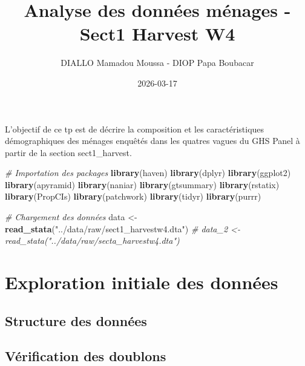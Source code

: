 \documentclass[
]{article}
\title{Analyse des données ménages - Sect1 Harvest W4}
\author{DIALLO Mamadou Moussa - DIOP Papa Boubacar}
\date{2026-03-17}
\newenvironment{Shaded}{\begin{snugshade}}{\end{snugshade}}
\newcommand{\CommentTok}[1]{\textcolor[rgb]{0.56,0.35,0.01}{\textit{#1}}}
\newcommand{\FunctionTok}[1]{\textcolor[rgb]{0.13,0.29,0.53}{\textbf{#1}}}
\newcommand{\NormalTok}[1]{#1}
\newcommand{\OtherTok}[1]{\textcolor[rgb]{0.56,0.35,0.01}{#1}}
\newcommand{\StringTok}[1]{\textcolor[rgb]{0.31,0.60,0.02}{#1}}
\begin{document}
\maketitle

{
\setcounter{tocdepth}{2}
\tableofcontents
}
L'objectif de ce tp est de décrire la composition et les
caractéristiques démographiques des ménages enquêtés dans les quatres
vagues du GHS Panel à partir de la section sect1\_harvest.

\begin{Shaded}
\begin{Highlighting}[]
\CommentTok{\# Importation des packages}
\FunctionTok{library}\NormalTok{(haven)}
\FunctionTok{library}\NormalTok{(dplyr)}
\FunctionTok{library}\NormalTok{(ggplot2)}
\FunctionTok{library}\NormalTok{(apyramid)}
\FunctionTok{library}\NormalTok{(naniar)}
\FunctionTok{library}\NormalTok{(gtsummary)}
\FunctionTok{library}\NormalTok{(rstatix)}
\FunctionTok{library}\NormalTok{(PropCIs)}
\FunctionTok{library}\NormalTok{(patchwork)}
\FunctionTok{library}\NormalTok{(tidyr)}
\FunctionTok{library}\NormalTok{(purrr)}
\end{Highlighting}
\end{Shaded}

\begin{Shaded}
\begin{Highlighting}[]
\CommentTok{\# Chargement des données}
\NormalTok{data }\OtherTok{\textless{}{-}} \FunctionTok{read\_stata}\NormalTok{(}\StringTok{"../data/raw/sect1\_harvestw4.dta"}\NormalTok{)}
\CommentTok{\# data\_2 \textless{}{-} read\_stata("../data/raw/secta\_harvestw4.dta")}
\end{Highlighting}
\end{Shaded}

\section{Exploration initiale des
données}\label{exploration-initiale-des-donnuxe9es}

\subsection{Structure des données}\label{structure-des-donnuxe9es}

\subsection{Vérification des
doublons}\label{vuxe9rification-des-doublons}
\end{document}
